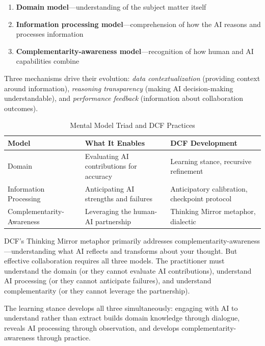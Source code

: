 \begin{enumerate}
    \item \textbf{Domain model}---understanding of the subject matter itself
    \item \textbf{Information processing model}---comprehension of how the AI reasons and processes information
    \item \textbf{Complementarity-awareness model}---recognition of how human and AI capabilities combine
\end{enumerate}

Three mechanisms drive their evolution: \emph{data contextualization} (providing context around information), \emph{reasoning transparency} (making AI decision-making understandable), and \emph{performance feedback} (information about collaboration outcomes).

\begin{table}[H]
\centering
\begin{tabular}{lp{5cm}p{5cm}}
\toprule
\textbf{Model} & \textbf{What It Enables} & \textbf{DCF Development} \\
\midrule
Domain & Evaluating AI contributions for accuracy & Learning stance, recursive refinement \\
Information Processing & Anticipating AI strengths and failures & Anticipatory calibration, checkpoint protocol \\
Complementarity-Awareness & Leveraging the human-AI partnership & Thinking Mirror metaphor, dialectic \\
\bottomrule
\end{tabular}
\caption{Mental Model Triad and DCF Practices}
\end{table}

DCF's Thinking Mirror metaphor primarily addresses complementarity-awareness---understanding what AI reflects and transforms about your thought. But effective collaboration requires all three models. The practitioner must understand the domain (or they cannot evaluate AI contributions), understand AI processing (or they cannot anticipate failures), and understand complementarity (or they cannot leverage the partnership).

The learning stance develops all three simultaneously: engaging with AI to understand rather than extract builds domain knowledge through dialogue, reveals AI processing through observation, and develops complementarity-awareness through practice.
